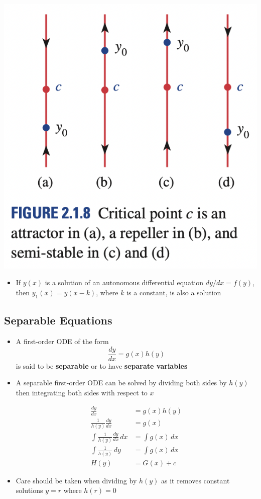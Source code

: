 \documentclass{article}
\begin{document}
\includegraphics*{attractors-and-repellers.png}

\begin{itemize}
  \item If $y(x)$ is a solution of an autonomous differential equation $d y / d x = f(y)$, then $y_1(x) = y (x - k)$, where $k$ is a constant, is also a solution
\end{itemize}

\subsection{Separable Equations}

\begin{itemize}
  \item A first-order ODE of the form \[\frac{d y}{d x} = g(x) h(y)\] is said to be \textbf{separable} or to have \textbf{separate variables}

  \item A separable first-order ODE can be solved by dividing both sides by $h(y)$ then integrating both sides with respect to $x$

        \begin{align*}
          \frac{d y}{d x}                          & = g(x) h(y)      \\
          \frac{1}{h(y)} \frac{d y}{d x}           & = g(x)           \\
          \int \frac{1}{h(y)} \frac{d y}{d x} \,dx & = \int g(x) \,dx \\
          \int \frac{1}{h(y)} \,dy                 & = \int g(x) \,dx \\
          H(y)                                     & = G(x) + c
        \end{align*}

  \item Care should be taken when dividing by $h(y)$ as it removes constant solutions $y = r$ where $h(r) = 0$
\end{itemize}
\end{document}
